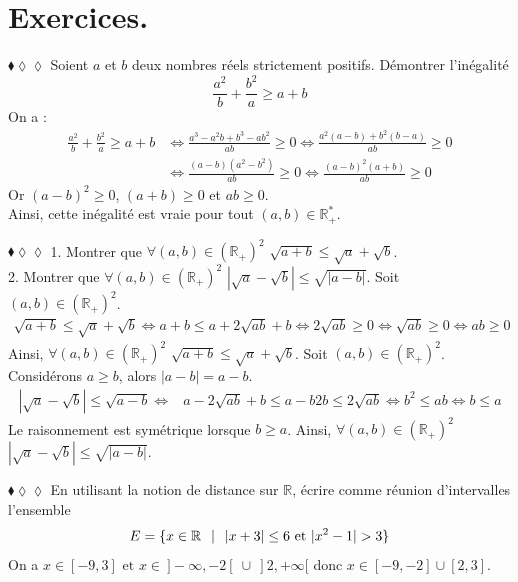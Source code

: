 \documentclass[11pt]{article}
\begin{document}
\vspace*{-0.5cm}

\section{Exercices.}

\begin{exercice}{$\blacklozenge\lozenge\lozenge$}{}
    Soient $a$ et $b$ deux nombres réels strictement positifs. Démontrer l'inégalité
    \begin{equation*}
        \frac{a^2}{b}+\frac{b^2}{a} \geq a + b
    \end{equation*}
    \tcblower
    On a :
    \begin{align*}
        \frac{a^2}{b}+\frac{b^2}{a} \geq a+b &\iff\frac{a^3-a^2b+b^3-ab^2}{ab}\geq0\iff\frac{a^2(a-b)+b^2(b-a)}{ab}\geq0 \\
        &\iff\frac{(a-b)(a^2-b^2)}{ab}\geq0\iff\frac{(a-b)^2(a+b)}{ab}\geq0
    \end{align*}
    Or $(a-b)^2\geq0$, $(a+b)\geq0$ et $ab\geq0$.\\
    Ainsi, cette inégalité est vraie pour tout $(a,b)\in\mathbb{R}^*_+$.
\end{exercice}

\begin{exercice}{$\blacklozenge\lozenge\lozenge$}{}
    1. Montrer que $\forall(a,b)\in(\mathbb{R}_+)^2$ $\sqrt{a+b}\leq\sqrt{a}+\sqrt{b}$.\\
    2. Montrer que $\forall(a,b)\in(\mathbb{R}_+)^2$ $|\sqrt{a}-\sqrt{b}|\leq\sqrt{|a-b|}$.
    \tcblower
     Soit $(a,b)\in(\mathbb{R}_+)^2$.
    \begin{align*}
        \sqrt{a+b}\leq\sqrt{a}+\sqrt{b} \iff a+b\leq a + 2\sqrt{ab} + b \iff2\sqrt{ab} \geq 0
        \iff \sqrt{ab} \geq 0\iff ab \geq 0
    \end{align*}
    Ainsi, $\forall(a,b)\in(\mathbb{R}_+)^2$ $\sqrt{a+b}\leq\sqrt{a}+\sqrt{b}$.\n
     Soit $(a,b)\in(\mathbb{R}_+)^2$. Considérons $a\geq b$, alors $|a-b| = a-b$.
    \begin{align*}
        |\sqrt{a}-\sqrt{b}|\leq\sqrt{a-b}\iff& a - 2\sqrt{ab} + b \leq a-b 2b \leq 2\sqrt{ab} \iff b^2 \leq ab \iff b \leq a
    \end{align*}
    Le raisonnement est symétrique lorsque $b\geq a$. Ainsi, $\forall(a,b)\in(\mathbb{R}_+)^2$ $|\sqrt{a}-\sqrt{b}|\leq\sqrt{|a-b|}$.
\end{exercice}

\begin{exercice}{$\blacklozenge\lozenge\lozenge$}{}
    En utilisant la notion de distance sur $\mathbb{R}$, écrire comme réunion d'intervalles l'ensemble
    \begin{equation*}
        E=\{x\in\mathbb{R} \hspace{0.25cm} | \hspace{0.25cm} |x+3| \leq 6 \text{ et } |x^2-1| > 3\}
    \end{equation*}
    \tcblower
    On a $x\in[-9,3] \text{ et } x\in~]-\infty, -2[~\cup~]2,+\infty[$ donc $x\in[-9,-2]\cup[2,3]$.
\end{exercice}
\end{document}
